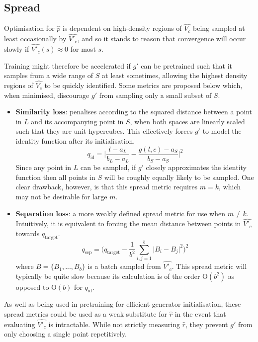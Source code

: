 \documentclass[../../main.tex]{subfiles}
\begin{document}
\subsection{Spread} \label{subsection:spread}

Optimisation for $\hat{p}$ is dependent on high-density regions of $\hat{V_c}$ being sampled at least occasionally by $\hat{V'_c}$, and so it stands to reason that convergence will occur slowly if $\hat{V'_c}(s)\approx 0$ for most $s$.

Training might therefore be accelerated if $g'$ can be pretrained such that it samples from a wide range of $S$ at least sometimes, allowing the highest density regions of $\hat{V_c}$ to be quickly identified.
Some metrics are proposed below which, when minimised, discourage $g'$ from sampling only a small subset of $S$.
\begin{itemize}
    \item[] \textbf{Similarity loss}: penalises according to the squared distance between a point in $L$ and its accompanying point in $S$, when both spaces are linearly scaled such that they are unit hypercubes.
    This effectively forces $g'$ to model the identity function after its initialisation.
    \begin{equation}
        q_\text{id}=\bigg|\frac{l-a_L}{b_L-a_L}-\frac{g(l,c)-a_S}{b_S-a_S}\bigg|^2
    \end{equation}
    Since any point in $L$ can be sampled, if $g'$ closely approximates the identity function then all points in $S$ will be roughly equally likely to be sampled.
    One clear drawback, however, is that this spread metric requires $m=k$, which may not be desirable for large $m$.
    \item[] \textbf{Separation loss}: a more weakly defined spread metric for use when $m\neq k$.
    Intuitively, it is equivalent to forcing the mean distance between points in $\hat{V'_c}$ towards $q_\text{target}$. 
    \begin{equation}
        q_\text{sep}=\bigg(q_\text{target}-\frac{1}{b^2}\sum_{i,j=1}^b\big|B_i-B_j\big|^2\bigg)^2
    \end{equation}
    where $B=\{B_1,...,B_b\}$ is a batch sampled from $\hat{V'_c}$.
    This spread metric will typically be quite slow because its calculation is of the order $\text{O}(b^2)$ as opposed to $\text{O}(b)$ for $q_\text{id}$.
\end{itemize}
As well as being used in pretraining for efficient generator initialisation, these spread metrics could be used as a weak substitute for $\hat{r}$ in the event that evaluating $\hat{V'_c}$ is intractable.
While not strictly measuring $\hat{r}$, they prevent $g'$ from only choosing a single point repetitively.
\end{document}
